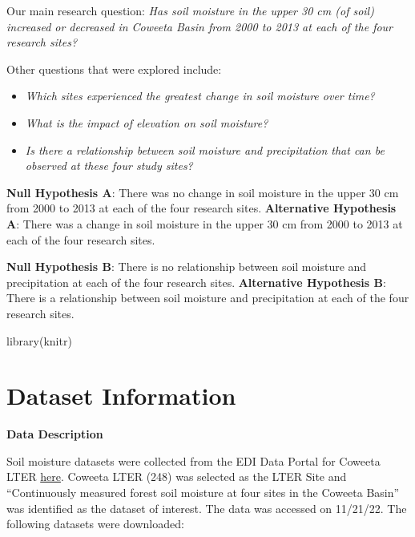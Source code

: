 \documentclass[
  12pt,
]{article}
\newenvironment{Shaded}{\begin{snugshade}}{\end{snugshade}}
\newcommand{\FunctionTok}[1]{\textcolor[rgb]{0.00,0.00,0.00}{#1}}
\newcommand{\NormalTok}[1]{#1}
\providecommand{\tightlist}{%
  \setlength{\itemsep}{0pt}\setlength{\parskip}{0pt}}
\begin{document}
Our main research question: \emph{Has soil moisture in the upper 30 cm
(of soil) increased or decreased in Coweeta Basin from 2000 to 2013 at
each of the four research sites?}

Other questions that were explored include:

\begin{itemize}
\tightlist
\item
  \emph{Which sites experienced the greatest change in soil moisture
  over time?}
\item
  \emph{What is the impact of elevation on soil moisture?}
\item
  \emph{Is there a relationship between soil moisture and precipitation
  that can be observed at these four study sites?}
\end{itemize}

\textbf{Null Hypothesis A}: There was no change in soil moisture in the
upper 30 cm from 2000 to 2013 at each of the four research sites.
\textbf{Alternative Hypothesis A}: There was a change in soil moisture
in the upper 30 cm from 2000 to 2013 at each of the four research sites.

\textbf{Null Hypothesis B}: There is no relationship between soil
moisture and precipitation at each of the four research sites.
\textbf{Alternative Hypothesis B}: There is a relationship between soil
moisture and precipitation at each of the four research sites.

\begin{Shaded}
\begin{Highlighting}[]
\FunctionTok{library}\NormalTok{(knitr)}
\end{Highlighting}
\end{Shaded}

\newpage

\hypertarget{dataset-information}{%
\section{Dataset Information}\label{dataset-information}}

\textbf{Data Description}

Soil moisture datasets were collected from the EDI Data Portal for
Coweeta LTER \href{https://portal.edirepository.org/nis/home.jsp}{here}.
Coweeta LTER (248) was selected as the LTER Site and ``Continuously
measured forest soil moisture at four sites in the Coweeta Basin'' was
identified as the dataset of interest. The data was accessed on
11/21/22. The following datasets were downloaded:
\end{document}
